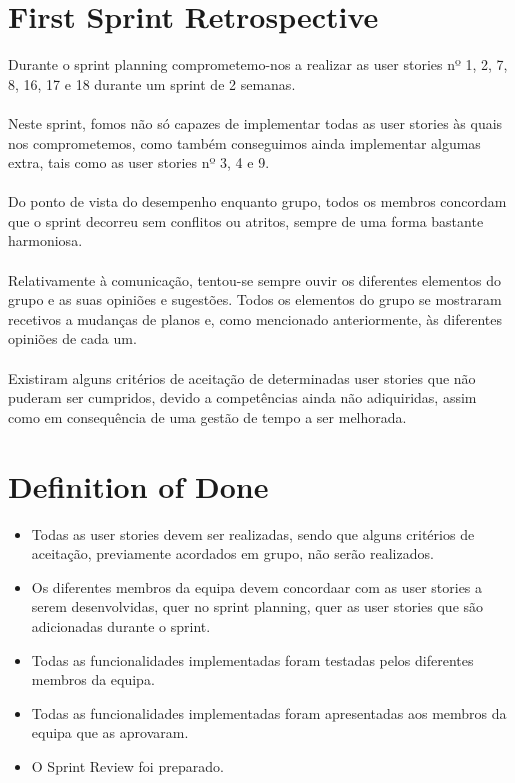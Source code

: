 \documentclass[a4paper,11pt]{article}
\begin{document}
\section{First Sprint Retrospective}
Durante o sprint planning comprometemo-nos a realizar as user stories nº 1, 2, 7, 8, 16, 17 e 18 durante um sprint de 2 semanas.\\\\
Neste sprint, fomos não só capazes de implementar todas as user stories às quais nos comprometemos, como também conseguimos ainda implementar algumas extra, tais como as user stories nº 3, 4 e 9.\\\\
Do ponto de vista do desempenho enquanto grupo, todos os membros concordam que o sprint decorreu sem conflitos ou atritos, sempre de uma forma bastante harmoniosa.\\\\
Relativamente à comunicação, tentou-se sempre ouvir os diferentes elementos do grupo e as suas opiniões e sugestões. Todos os elementos do grupo se mostraram recetivos a mudanças de planos e, como mencionado anteriormente, às diferentes opiniões de cada um.\\\\
Existiram alguns critérios de aceitação de determinadas user stories que não puderam ser cumpridos, devido a competências ainda não adiquiridas, assim como em consequência de uma gestão de tempo a ser melhorada.

\section{Definition of Done}
\begin{itemize}
  \item Todas as user stories devem ser realizadas, sendo que alguns critérios de aceitação, previamente acordados em grupo, não serão realizados.
  \item Os diferentes membros da equipa devem concordaar com as user stories a serem desenvolvidas, quer no sprint planning, quer as user stories que são adicionadas durante o sprint.
  \item Todas as funcionalidades implementadas foram testadas pelos diferentes membros da equipa.
  \item Todas as funcionalidades implementadas foram apresentadas aos membros da equipa que as aprovaram.
  \item O Sprint Review foi preparado.
\end{itemize}
\end{document}
